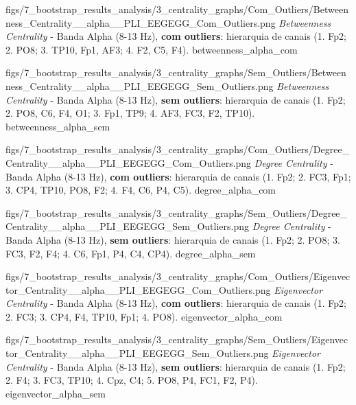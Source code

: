 \ultrawidefigure
  {figs/7_bootstrap_results_analysis/3_centrality_graphs/Com_Outliers/Betweenness_Centrality__alpha__PLI_EEGEGG_Com_Outliers.png}
  {\textit{Betweenness Centrality} - Banda Alpha (8-13 Hz), \textbf{com outliers}: hierarquia de canais (1. Fp2; 2. PO8; 3. TP10, Fp1, AF3; 4. F2, C5, F4).}
  {betweenness_alpha_com}

\ultrawidefigure
  {figs/7_bootstrap_results_analysis/3_centrality_graphs/Sem_Outliers/Betweenness_Centrality__alpha__PLI_EEGEGG_Sem_Outliers.png}
  {\textit{Betweenness Centrality} - Banda Alpha (8-13 Hz), \textbf{sem outliers}: hierarquia de canais (1. Fp2; 2. PO8, C6, F4, O1; 3. Fp1, TP9; 4. AF3, FC3, F2, TP10).}
  {betweenness_alpha_sem}


\ultrawidefigure
  {figs/7_bootstrap_results_analysis/3_centrality_graphs/Com_Outliers/Degree_Centrality__alpha__PLI_EEGEGG_Com_Outliers.png}
  {\textit{Degree Centrality} - Banda Alpha (8-13 Hz), \textbf{com outliers}: hierarquia de canais (1. Fp2; 2. FC3, Fp1; 3. CP4, TP10, PO8, F2; 4. F4, C6, P4, C5).}
  {degree_alpha_com}

\ultrawidefigure
  {figs/7_bootstrap_results_analysis/3_centrality_graphs/Sem_Outliers/Degree_Centrality__alpha__PLI_EEGEGG_Sem_Outliers.png}
  {\textit{Degree Centrality} - Banda Alpha (8-13 Hz), \textbf{sem outliers}: hierarquia de canais (1. Fp2; 2. PO8; 3. FC3, F2, F4; 4. C6, Fp1, P4, C4, CP4).}
  {degree_alpha_sem}


\ultrawidefigure
  {figs/7_bootstrap_results_analysis/3_centrality_graphs/Com_Outliers/Eigenvector_Centrality__alpha__PLI_EEGEGG_Com_Outliers.png}
  {\textit{Eigenvector Centrality} - Banda Alpha (8-13 Hz), \textbf{com outliers}: hierarquia de canais (1. Fp2; 2. FC3; 3. CP4, F4, TP10, Fp1; 4. PO8).}
  {eigenvector_alpha_com}

\ultrawidefigure
  {figs/7_bootstrap_results_analysis/3_centrality_graphs/Sem_Outliers/Eigenvector_Centrality__alpha__PLI_EEGEGG_Sem_Outliers.png}
  {\textit{Eigenvector Centrality} - Banda Alpha (8-13 Hz), \textbf{sem outliers}: hierarquia de canais (1. Fp2; 2. F4; 3. FC3, TP10; 4. Cpz, C4; 5. PO8, P4, FC1, F2, P4).}
  {eigenvector_alpha_sem}


